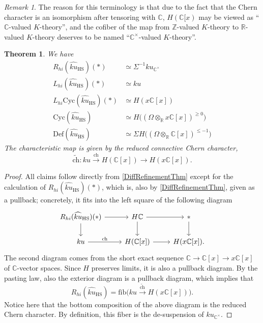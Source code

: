 \documentclass[a4paper]{book}
\newcommand{\bC}{\mathbb{C}}
\newcommand{\bR}{\mathbb{R}}
\newcommand{\bZ}{\mathbb{Z}}
\newcommand{\ch}{\mathrm{ch}}
\newtheorem{theorem}[equation]{Theorem}
\theoremstyle{definition}
\theoremstyle{remark}
\newtheorem{remark}[equation]{Remark}
\numberwithin{equation}{section}
\begin{document}
\begin{remark}
The reason for this terminology is that due to the fact that the Chern character is an isomorphism after tensoring with $\bC$, $H(\bC[x)$ may be viewed as ``$\bC$-valued $K$-theory'', and the cofiber of the map from $\bZ$-valued $K$-theory to $\bR$-valued $K$-theory deserves to be named ``$\bC^\times$-valued $K$-theory''.
\end{remark}

\begin{theorem}
We have
\begin{align*}
R_{hi}(\widehat{ku}_{\mathrm{HS}})(*) &\simeq \Sigma^{-1} ku_{\bC^\times}
\\
L_{hi}(\widehat{ku}_{\mathrm{HS}})(*)
&\simeq ku
\\
L_{hi}\mathrm{Cyc}(\widehat{ku}_{\mathrm{HS}})(*)
&\simeq H(x\bC[x])
\\
\mathrm{Cyc}(\widehat{ku}_{\mathrm{HS}})
&\simeq H\bigl((\Omega \otimes_\bR x\bC[x])^{\geq 0}\bigr)
\\
\mathrm{Def}(\widehat{ku}_{\mathrm{HS}})
&\simeq \Sigma H\bigl((\Omega \otimes_\bR \bC[x])^{\leq -1}\bigr)
\end{align*}
The characteristic map is given by the reduced connective Chern character,
\[
\widetilde{\ch} : ku \stackrel{\ch}{\longrightarrow} H(\bC[x]) \longrightarrow H(x\bC[x]).
\]
\end{theorem}

\begin{proof}
All claims follow directly from \cref{DiffRefinementThm} except for the calculation of $R_{hi}(\widehat{ku}_{\mathrm{HS}})(*)$, which is, also by \cref{DiffRefinementThm}, given as a pullback; concretely, it fits into the left square of the following diagram
\[
\begin{tikzcd}
	R_{hi}(\widehat{ku}_{\mathrm{HS}})(*)
	\ar[r]
	\ar[d] &
	H\bC
	\ar[d]
	\ar[r] & * \ar[d]
	\\
	ku \ar[r, "\ch"] & H(\bC[x]) \ar[r] & H(x\bC[x]).
\end{tikzcd}
\]
The second diagram comes from the short exact sequence $\bC \to \bC[x] \to x\bC[x]$ of $\bC$-vector spaces. Since $H$ preserves limits, it is also a pullback diagram. By the pasting law, also the exterior diagram is a pullback diagram, which implies that
\[
R_{hi}(\widehat{ku}_{\mathrm{HS}}) = \mathrm{fib}\bigl(ku \stackrel{\widetilde{\ch}}{\longrightarrow} H(x\bC[x])\bigr).
\]
Notice here that the bottom composition of the above diagram is the reduced Chern character. By definition, this fiber is the de-suspension of $ku_{\bC^\times}$.
\end{proof}
\end{document}
